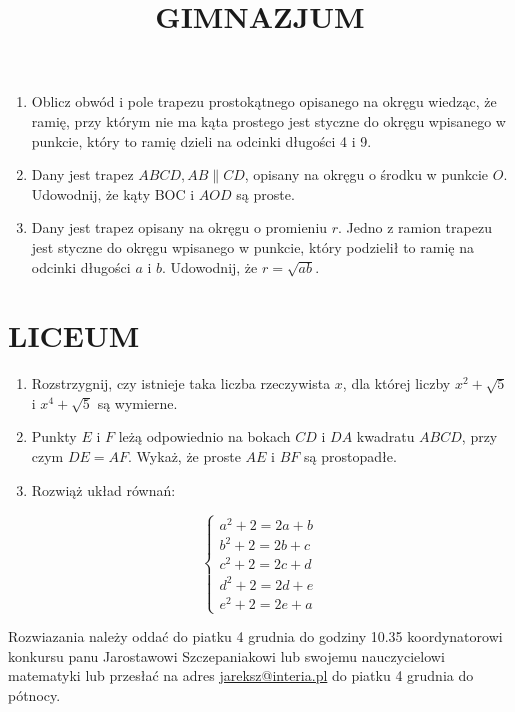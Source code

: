 \documentclass[10pt]{article}
\title{GIMNAZJUM }
\author{}
\date{}
\begin{document}
\maketitle
\begin{enumerate}
  \item Oblicz obwód i pole trapezu prostokątnego opisanego na okręgu wiedząc, że ramię, przy którym nie ma kąta prostego jest styczne do okręgu wpisanego w punkcie, który to ramię dzieli na odcinki długości 4 i 9.
  \item Dany jest trapez \(A B C D, A B \| C D\), opisany na okręgu o środku w punkcie \(O\). Udowodnij, że kąty BOC i \(A O D\) są proste.
  \item Dany jest trapez opisany na okręgu o promieniu \(r\). Jedno z ramion trapezu jest styczne do okręgu wpisanego w punkcie, który podzielił to ramię na odcinki długości \(a\) i \(b\). Udowodnij, że \(r=\sqrt{a b}\).
\end{enumerate}

\section*{LICEUM}
\begin{enumerate}
  \item Rozstrzygnij, czy istnieje taka liczba rzeczywista \(x\), dla której liczby \(x^{2}+\sqrt{5}\) i \(x^{4}+\sqrt{5}\) są wymierne.
  \item Punkty \(E\) i \(F\) leżą odpowiednio na bokach \(C D\) i \(D A\) kwadratu \(A B C D\), przy czym \(D E=A F\). Wykaż, że proste \(A E\) i \(B F\) są prostopadłe.
  \item Rozwiąż układ równań:
\end{enumerate}

\[
\left\{\begin{array}{l}
a^{2}+2=2 a+b \\
b^{2}+2=2 b+c \\
c^{2}+2=2 c+d \\
d^{2}+2=2 d+e \\
e^{2}+2=2 e+a
\end{array}\right.
\]

Rozwiazania należy oddać do piatku 4 grudnia do godziny 10.35 koordynatorowi konkursu panu Jarostawowi Szczepaniakowi lub swojemu nauczycielowi matematyki lub przesłać na adres \href{mailto:jareksz@interia.pl}{jareksz@interia.pl} do piatku 4 grudnia do pótnocy.
\end{document}
